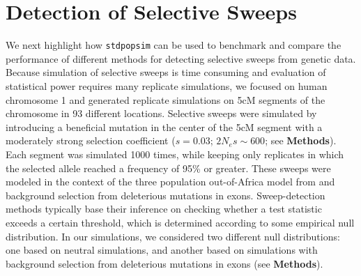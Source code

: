 \documentclass[hidelinks]{article}
\newcommand{\stdpopsim}{\texttt{stdpopsim}\xspace}
\begin{document}
\section*{Detection of Selective Sweeps}
    \label{sweeps}
    We next highlight how \stdpopsim can be used to benchmark and compare
    the performance of different methods for detecting selective sweeps from genetic data.
    Because simulation of selective sweeps is time consuming and evaluation of statistical power requires
    many replicate simulations, we focused on human chromosome 1 and generated replicate simulations on 5cM segments
    of the chromosome in 93 different locations. %
    Selective sweeps were simulated by introducing a beneficial mutation in the center of the 5cM segment
    with a moderately strong selection coefficient ($s = 0.03$; $2N_es \sim 600$; see \textbf{Methods}).
    Each segment was simulated 1000 times, while keeping only replicates in which the selected allele reached a frequency of 95\% or greater.
    These sweeps were modeled in the context of the three population out-of-Africa model from \citet{gutenkunst2009inferring}
    and background selection from deleterious mutations in exons.
    Sweep-detection methods typically base their inference on checking whether a test statistic
    exceeds a certain threshold, which is determined according to some empirical null distribution.
    In our simulations, we considered two different null distributions:
    one based on neutral simulations, and another based on simulations with background selection
    from deleterious mutations in exons (see \textbf{Methods}).
\end{document}
